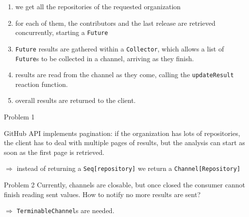 \documentclass[aspectratio=169,xcolor=dvipsnames]{beamer}
\begin{document}

\begin{frame}
    
    \footnotesize
    \begin{enumerate}
        \item we get all the repositories of the requested organization
        \item for each of them, the contributors and the last release are retrieved concurrently, starting a \texttt{Future}
        \item \texttt{Future} results are gathered within a \texttt{Collector}, which allows a list of \texttt{Future}s to be collected in a channel, arriving as they finish.
        \item results are read from the channel as they come, calling the \texttt{updateResult} reaction function.
        \item overall results are returned to the client.
    \end{enumerate}
\end{frame}


\begin{frame}
    \begin{alertblock}{Problem 1}
        
        \small
        GitHub API implements pagination: if the organization has lots of repositories, the client has to deal with multiple pages of results, but the analysis can start as soon as the first page is retrieved.
    \end{alertblock}
    \pause
    \small$\Rightarrow$ instead of returning a \texttt{Seq[repository]} we return a \texttt{Channel[Repository]}
    \pause
    \begin{alertblock}{Problem 2}
        \small
        Currently, channels are closable, but once closed the consumer cannot finish reading sent values. How to notify no more results are sent?
    \end{alertblock}
    \pause
    \small$\Rightarrow$ \texttt{TerminableChannel}s are needed.
    
\end{frame}

\end{document}
